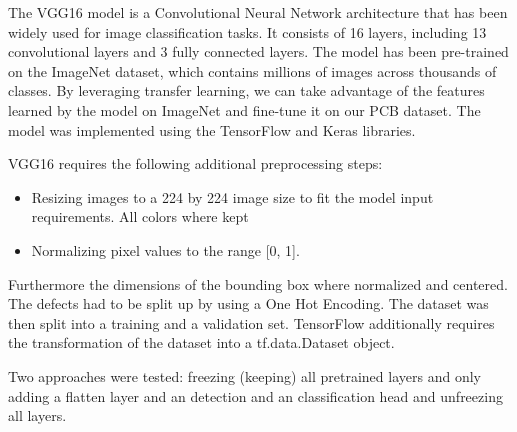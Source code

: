 \documentclass[12pt]{article}
\begin{document}
The VGG16 model is a Convolutional Neural Network architecture that has been widely used for image classification tasks. It consists of 16 layers, including 13 convolutional layers and 3 fully connected layers. The model has been pre-trained on the ImageNet dataset, which contains millions of images across thousands of classes. By leveraging transfer learning, we can take advantage of the features learned by the model on ImageNet and fine-tune it on our PCB dataset.
The model was implemented using the TensorFlow and Keras libraries. 

VGG16 requires the following additional preprocessing steps: 

\begin{itemize}
    \item Resizing images to a 224 by 224 image size to fit the model input requirements. All colors where kept
    \item Normalizing pixel values to the range [0, 1].  
\end{itemize}

Furthermore the dimensions of the bounding box where normalized and centered. The defects had to be split up by using a One Hot Encoding. The dataset was then split into a training and a validation set. 
TensorFlow additionally requires the transformation of the dataset into a tf.data.Dataset object.

Two approaches were tested: freezing (keeping) all pretrained layers and only adding a flatten layer and an detection and an classification head and unfreezing all layers.
\end{document}
